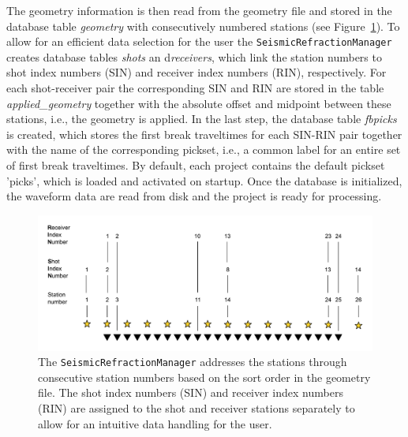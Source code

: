 \documentclass[a4paper,fleqn]{cas-sc}
\begin{document}
The geometry information is then read from the geometry file and stored in the database table \textit{geometry} with consecutively numbered stations (see Figure~\ref{fig:statnum}). To allow for an efficient data selection for the user the \texttt{SeismicRefractionManager} creates database tables \textit{shots} an d\textit{receivers}, which link the station numbers to shot index numbers (SIN) and receiver index numbers (RIN), respectively. For each shot-receiver pair the corresponding SIN and RIN are stored in the table \textit{applied\_geometry} together with the absolute offset and midpoint between these stations, i.e., the geometry is applied.
In the last step, the database table \textit{fbpicks} is created, which stores the first break traveltimes for each SIN-RIN pair together with the name of the corresponding pickset, i.e., a common label for an entire set of first break traveltimes. By default, each project contains the default pickset 'picks', which is loaded and activated on startup. Once the database is initialized, the waveform data are read from disk and the project is ready for processing.
\begin{figure}
	\centering
	\includegraphics[width=.75\textwidth]{figures/station_numbering.pdf}
	\caption{The \texttt{SeismicRefractionManager} addresses the stations through consecutive station numbers based on the sort order in the geometry file. The shot index numbers (SIN) and receiver index numbers (RIN) are assigned to the shot and receiver stations separately to allow for an intuitive data handling for the user.}
	\label{fig:statnum}
\end{figure}

\end{document}
